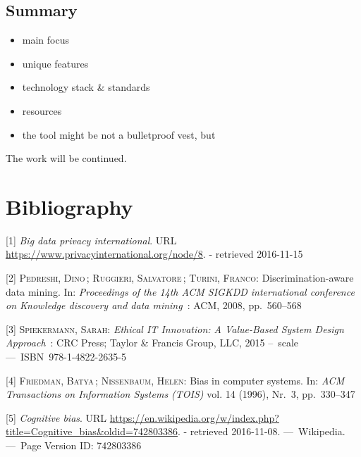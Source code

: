\documentclass[12pt,english,a4paper,titlepage,cleardoublepage=empty,dottedtoc]{report}
\providecommand{\tightlist}{%
  \setlength{\itemsep}{0pt}\setlength{\parskip}{0pt}}
\begin{document}
\section{Summary}\label{summary}

\begin{itemize}
\tightlist
\item
  main focus
\item
  unique features
\item
  technology stack \& standards
\item
  resources
\item
  the tool might be not a bulletproof vest, but
\end{itemize}

The work will be continued.

\chapter*{Bibliography}\label{bibliography}

\hypertarget{refs}{}
\hypertarget{ref-web_2016_privacy-international-about-big-data}{}
{[}1{]} \emph{Big data privacy international}. URL
\url{https://www.privacyinternational.org/node/8}. - retrieved
2016-11-15

\hypertarget{ref-paper_2008_discrimination-aware-data-mining}{}
{[}2{]} \textsc{Pedreshi, Dino}\,; \textsc{Ruggieri, Salvatore}\,;
\textsc{Turini, Franco}: Discrimination-aware data mining. In:
\emph{Proceedings of the 14th ACM SIGKDD international conference on
Knowledge discovery and data mining}~: ACM, 2008, pp.~560--568

\hypertarget{ref-book_2015_ethical-it-innovation_ethical-uses-of-information-and-knowledge}{}
{[}3{]} \textsc{Spiekermann, Sarah}: \emph{Ethical IT Innovation: A
Value-Based System Design Approach}~: CRC Press; Taylor \& Francis
Group, LLC, 2015 --~scale ---~ISBN~978-1-4822-2635-5

\hypertarget{ref-paper_1996_bias-in-computer-systems}{}
{[}4{]} \textsc{Friedman, Batya}\,; \textsc{Nissenbaum, Helen}: Bias in
computer systems. In: \emph{ACM Transactions on Information Systems
(TOIS)} vol. 14 (1996), Nr.~3, pp.~330--347

\hypertarget{ref-wikipedia_2016_cognitive-bias}{}
{[}5{]} \emph{Cognitive bias}. URL
\url{https://en.wikipedia.org/w/index.php?title=Cognitive_bias\&oldid=742803386}.
- retrieved 2016-11-08. ---~Wikipedia. ---~Page Version ID: 742803386
\end{document}
